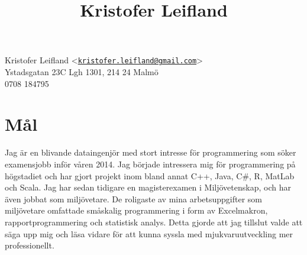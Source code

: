 \documentclass[10pt]{article}
\title{Kristofer Leifland}
\author{}
\date{}
\begin{document}
\maketitle
\thispagestyle{empty}
\pagestyle{empty}
\noindent
Kristofer Leifland <\href{mailto:kristofer.leifland@gmail.com}{\nolinkurl{kristofer.leifland@gmail.com}}>\\
Ystadsgatan 23C Lgh 1301, 214 24 Malmö\\
0708 184795\\

\section*{Mål}
Jag är en blivande dataingenjör med stort intresse för programmering som söker examensjobb inför våren 2014. Jag började intressera mig för programmering på högstadiet och har gjort projekt inom bland annat C++, Java, C\#, R, MatLab och Scala. Jag har sedan tidigare en magisterexamen i Miljövetenskap, och har även jobbat som miljövetare. De roligaste av mina arbetsuppgifter som miljövetare omfattade småskalig programmering i form av Excelmakron, rapportprogrammering och statistisk analys. Detta gjorde att jag tillslut valde att säga upp mig och läsa vidare för att kunna syssla med mjukvaruutveckling mer professionellt.
\end{document}

